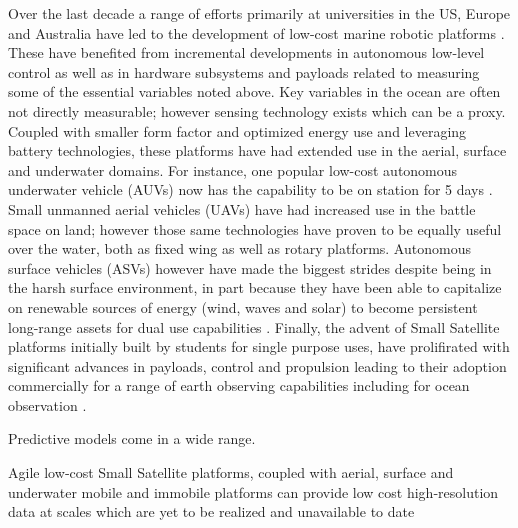 Over the last decade a range of efforts primarily at universities in
the US, Europe and Australia have led to the development of low-cost
marine robotic platforms \cite{}. These have benefited from
incremental developments in autonomous low-level control \cite{} as
well as in hardware subsystems and payloads related to measuring some
of the essential variables noted above. Key variables in the ocean are
often not directly measurable; however sensing technology exists which
can be a proxy. Coupled with smaller form factor and optimized energy
use and leveraging battery technologies, these platforms have had
extended use in the aerial, surface and underwater domains. For
instance, one popular low-cost autonomous underwater vehicle (AUVs)
now has the capability to be on station for 5 days \cite{}. Small
unmanned aerial vehicles (UAVs) have had increased use in the battle
space on land; however those same technologies have proven to be
equally useful over the water, both as fixed wing as well as rotary
platforms. Autonomous surface vehicles (ASVs) however have made the
biggest strides despite being in the harsh surface environment, in
part because they have been able to capitalize on renewable sources of
energy (wind, waves and solar) to become persistent long-range assets
for dual use capabilities \cite{}. Finally, the advent of Small
Satellite platforms initially built by students for single purpose
uses, have prolifirated with significant advances in payloads, control
and propulsion leading to their adoption commercially for a range of
earth observing capabilities including for ocean observation \cite{}.

Predictive models come in a wide range. 

Agile low‐cost Small Satellite platforms, coupled with aerial, surface
and underwater mobile and immobile platforms can provide low cost
high‐resolution data at scales which are yet to be realized and
unavailable to date
